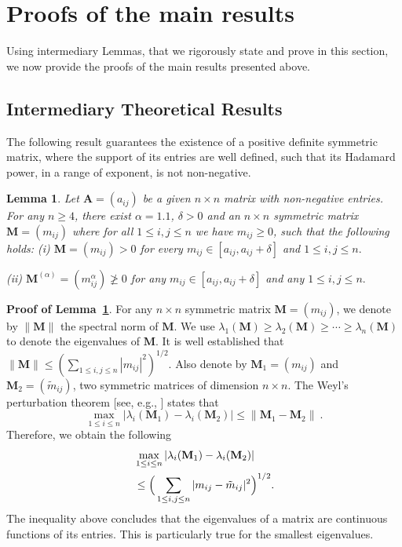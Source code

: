 \documentclass[conference,letterpaper]{IEEEtran}
\numberwithin{equation}{section}
\newcommand{\lbl}{\label}
\newcommand{\bea}{\begin{eqnarray}}
\newcommand{\eea}{\end{eqnarray}}
\newtheorem{lemma}{{\sc Lemma}}
\begin{document}
\section{Proofs of the main results}\lbl{sec:proofs}
Using intermediary Lemmas, that we rigorously state and prove in this section, we now provide the proofs of the main results presented above.

\subsection{Intermediary Theoretical Results}
The following result guarantees the existence of a positive definite symmetric matrix, where the support of its entries are well defined, such that its Hadamard power, in a range of exponent, is not non-negative.
\begin{lemma}\lbl{lemma:lem1}
Let $\mathbf{A}=(a_{ij})$ be a given $n\times n$ matrix with non-negative entries.
For any $n\geq 4$, there exist $\alpha = 1.1$, $\delta>0$ and an $n\times n$ symmetric matrix $\mathbf{M}=(m_{ij})$ where for all $1\leq i, j \leq n$ we have $m_{ij}\geq 0$, such that the following holds:
(i) $\mathbf{M}=(m_{ij})>0$  for every $m_{ij}\in [a_{ij}, a_{ij}+\delta]$ and $1\leq i, j \leq n.$

(ii) $\mathbf{M}^{(\alpha)}=(m_{ij}^{\alpha})\ngeqslant 0$  for any $m_{ij}\in [a_{ij}, a_{ij}+\delta]$ and any $1\leq i, j \leq n.$
\end{lemma}
\medskip
\noindent\textbf{Proof of Lemma~\ref{lemma:lem1}}. For any $n\times n$ symmetric matrix $\mathbf{M}=(m_{ij})$, we denote by $\|\mathbf{M}\|$ the spectral norm of $\mathbf{M}$. 
We use $\lambda_1(\mathbf{M})\geq \lambda_2(\mathbf{M})\geq \cdots \geq \lambda_n(\mathbf{M})$ to denote  the eigenvalues of $\mathbf{M}$.  
It is well established that $\|\mathbf{M}\|\leq (\sum_{1\leq i, j \leq n}|m_{ij}|^2)^{1/2}$. 
Also denote by $\mathbf{M}_1=(m_{ij})$ and $\mathbf{M}_2=(\tilde{m}_{ij})$, two symmetric matrices of dimension $n\times n$. 
The Weyl's perturbation theorem [see, e.g., \cite{horn1985}] states that
$$\max_{1\leq i \leq n}|\lambda_i(\mathbf{M}_1)-\lambda_i(\mathbf{M}_2)|\leq \|\mathbf{M}_1-\mathbf{M}_2\| \ .$$  
Therefore, we obtain the following
\bea
& \max_{1\leq i \leq n}|\lambda_i(\mathbf{M}_1)-\lambda_i(\mathbf{M}_2)|\\\notag
&\leq \Big(\sum_{1\leq i, j \leq n}|m_{ij}-\tilde{m}_{ij}|^2\Big)^{1/2}.\lbl{flower_could}
\eea
The inequality above concludes that the eigenvalues of a matrix are continuous functions of its entries. 
This is particularly true for the smallest eigenvalues.
\end{document}
